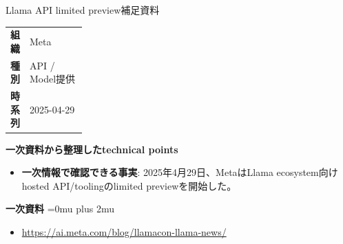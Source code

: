 \begin{technicalnote}{Llama API limited preview}{補足資料}
\begingroup
\begin{tabularx}{\linewidth}{@{}>{\bfseries}p{0.22\linewidth}X@{}}
組織 & Meta \\
種別 & API / Model提供 \\
時系列 & 2025-04-29 \\
\end{tabularx}
\smallskip
\begin{minipage}{\linewidth}
{\bfseries 一次資料から整理したtechnical points}
\begin{itemize}[leftmargin=1.5em,itemsep=0.35em]
\item \textbf{一次情報で確認できる事実}: 2025年4月29日、MetaはLlama ecosystem向けhosted API/toolingのlimited previewを開始した。
\end{itemize}
\begin{samepage}
{\bfseries 一次資料}
\begingroup\sloppy
\Urlmuskip=0mu plus 2mu\relax
\begin{itemize}[leftmargin=1.5em,itemsep=0.25em]
\item {\scriptsize\url{https://ai.meta.com/blog/llamacon-llama-news/}}
\end{itemize}
\endgroup
\end{samepage}
\end{minipage}
\endgroup
\end{technicalnote}
\medskip
